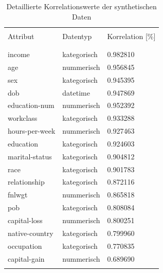 \begin{spacing}{1.5}
\begin{table}[!htb]
    \centering\footnotesize
    \begin{tabular}{lll}
        \toprule
        \\[-0.7em]
        Attribut & Datentyp & Korrelation [\%] \\
        \\[-0.9em]
        \midrule
        \\[-0.7em]
        income & kategorisch & 0.982810 \\
        age & nummerisch & 0.956845 \\
        sex & kategorisch & 0.945395 \\
        dob & datetime & 0.947869 \\
        education-num & nummerisch & 0.952392 \\
        workclass & kategorisch & 0.933288 \\
        hours-per-week & nummerisch & 0.927463 \\
        education & kategorisch & 0.924603 \\
        marital-status & kategorisch & 0.904812 \\
        race & kategorisch & 0.901783 \\
        relationship & kategorisch & 0.872116 \\
        fnlwgt & nummerisch & 0.865818 \\
        pob & kategorisch & 0.808084 \\
        capital-loss & nummerisch & 0.800251 \\
        native-country & kategorisch & 0.799960 \\
        occupation & kategorisch & 0.770835 \\
        capital-gain & nummerisch & 0.689690 \\
        \\[-0.9em]
        \bottomrule
    \end{tabular}
    \caption[Detaillierte Korrelationswerte der synthetischen Daten]{Detaillierte Korrelationswerte der synthetischen Daten\footnotemark}
    \label{tab:correlation-detailled}
\end{table}

\end{spacing}
